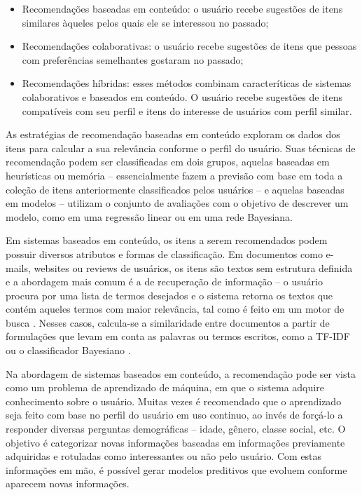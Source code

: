 \begin{itemize}
\item Recomendações baseadas em conteúdo: o usuário recebe sugestões de itens similares àqueles pelos quais ele se interessou no passado;
\item Recomendações colaborativas: o usuário recebe sugestões de itens que pessoas com preferências semelhantes gostaram no passado;
\item Recomendações híbridas: esses métodos combinam caracteríticas de sistemas colaborativos e baseados em conteúdo.  O usuário recebe sugestões de itens compatíveis com seu perfil e itens do interesse de usuários com perfil similar.
\end{itemize}

As estratégias de recomendação baseadas em conteúdo exploram os dados dos itens para calcular a sua relevância conforme o perfil do usuário. Suas técnicas de recomendação podem ser classificadas em dois grupos, aquelas baseadas em heurísticas ou memória -- essencialmente fazem a previsão com base em toda a coleção de itens anteriormente classificados pelos usuários -- e aquelas baseadas em modelos -- utilizam o conjunto de avaliações com o objetivo de descrever um modelo, como em uma regressão linear ou em uma rede Bayesiana. 

Em sistemas baseados em conteúdo, os itens a serem recomendados podem possuir diversos atributos e formas de classificação. Em documentos como e-mails, websites ou reviews de usuários, os itens são textos sem estrutura definida e a abordagem mais comum é a de recuperação de informação -- o usuário procura por uma lista de termos desejados e o sistema retorna os textos que contém aqueles termos com maior relevância, tal como é feito em um motor de busca \cite{schafer2001commerce}. Nesses casos, calcula-se a similaridade entre documentos a partir de formulações que levam em conta as palavras ou termos escritos, como a TF-IDF ou o classificador Bayesiano \cite{lops2011content-chap3}. 

Na abordagem de sistemas baseados em conteúdo, a recomendação pode ser vista como um problema de aprendizado de máquina, em que o sistema adquire conhecimento sobre o usuário. Muitas vezes é recomendado que o aprendizado seja feito com base no perfil do usuário em uso continuo, ao invés de forçá-lo a responder diversas perguntas demográficas \cite{wei2007survey} -- idade, gênero, classe social, etc. O objetivo é categorizar novas informações baseadas em informações previamente adquiridas e rotuladas como interessantes ou não pelo usuário. Com estas informações em mão, é possível gerar modelos preditivos que evoluem conforme aparecem novas informações.

